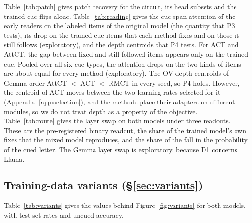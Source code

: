 \documentclass[11pt]{article}
\makeatletter
\newcommand\appflush{\par\if@firstcolumn\else\ifx\@deferlist\@empty\else\ifdim\dimexpr\pagegoal-\pagetotal\relax<0.4\textheight \mbox{}\newpage\fi\fi\fi}
\newcommand{\gemma}{Gemma}\newcommand{\gemmafull}{Gemma-2-2B-it}
\newcommand{\llama}{Llama}\newcommand{\llamafull}{Llama-3.1-8B-Instruct}
\makeatother
\begin{document}
Table~\ref{tab:patch} gives patch recovery for the circuit, its head subsets and the trained-cue flips alone. Table~\ref{tab:reading} gives the cue-span attention of the early readers on the labeled items of the original model (the quantity that P3 tests), its drop on the trained-cue items that each method fixes and on those it still follows (exploratory), and the depth centroids that P4 tests. For ACT and AttCT, the gap between fixed and still-followed items appears only on the trained cue. Pooled over all six cue types, the attention drops on the two kinds of items are about equal for every method (exploratory). The OV depth centroids of \gemma{} order AttCT $<$ ACT $<$ RMCT in every seed, so P4 holds. However, the centroid of ACT moves between the two learning rates selected for it (Appendix~\ref{app:selection}), and the methods place their adapters on different modules, so we do not treat depth as a property of the objective. Table~\ref{tab:route} gives the layer swap on both models under three readouts. These are the pre-registered binary readout, the share of the trained model's own fixes that the mixed model reproduces, and the share of the fall in the probability of the cued letter. The \gemma{} layer swap is exploratory, because D1 concerns \llama.

\appflush
\subsection{Training-data variants (\S\ref{sec:variants})}
\label{app:variants}
\begin{table}[t]\centering\scriptsize\setlength{\tabcolsep}{3pt}
\tabVariants
\caption{\textbf{Changing the training data of BCT.} Seed means for the BCT variants of Section~\ref{sec:variants} (defined in Appendix~\ref{app:details}). Response-only BCT is run on \gemma{} only. CAI (content-awareness index) is the helpful drop divided by the harmful drop ($^{*}$ marks a harmful drop below .05, which the registered criterion does not count as selective). Rel.\ red.\ is the relative reduction of harmful-cue following at the front and end positions.}
\label{tab:variants}
\end{table}
Table~\ref{tab:variants} gives the values behind Figure~\ref{fig:variants} for both models, with test-set rates and uncued accuracy.

\appflush
\end{document}
